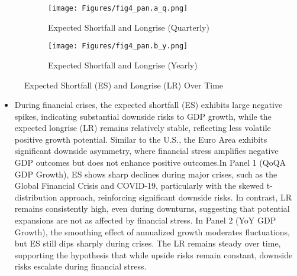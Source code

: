\documentclass{article}
\begin{document}
\begin{figure}[H]
    \centering
    \begin{subfigure}[b]{0.45\textwidth}
        \centering
        \texttt{[image: Figures/fig4\_pan.a\_q.png]}
        \caption{Expected Shortfall and Longrise (Quarterly)}
        \label{fig:sub_a}
    \end{subfigure}
    \hfill
    \begin{subfigure}[b]{0.45\textwidth}
        \centering
        \texttt{[image: Figures/fig4\_pan.b\_y.png]}
        \caption{Expected Shortfall and Longrise (Yearly)}
        \label{fig:sub_b}
    \end{subfigure}

    \caption{Expected Shortfall (ES) and Longrise (LR) Over Time}
    \label{fig:fig4_combined}
\end{figure}

\begin{itemize}
    \item During financial crises, the expected shortfall (ES) exhibits large negative spikes, indicating substantial downside risks to GDP growth, while the expected longrise (LR) remains relatively stable, reflecting less volatile positive growth potential. Similar to the U.S., the Euro Area exhibits significant downside asymmetry, where financial stress amplifies negative GDP outcomes but does not enhance positive outcomes.In Panel 1 (QoQA GDP Growth), ES shows sharp declines during major crises, such as the Global Financial Crisis and COVID-19, particularly with the skewed t-distribution approach, reinforcing significant downside risks. In contrast, LR remains consistently high, even during downturns, suggesting that potential expansions are not as affected by financial stress. In Panel 2 (YoY GDP Growth), the smoothing effect of annualized growth moderates fluctuations, but ES still dips sharply during crises. The LR remains steady over time, supporting the hypothesis that while upside risks remain constant, downside risks escalate during financial stress.
\end{itemize}
\end{document}
